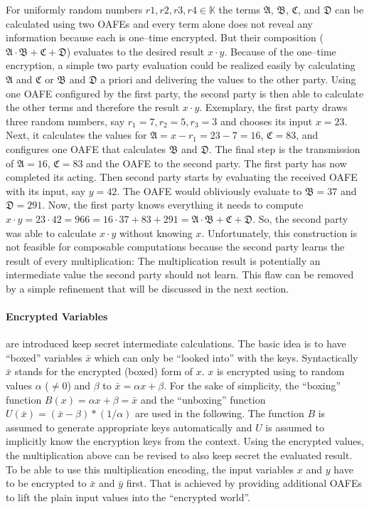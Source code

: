\noindent{}For uniformly random numbers $r1, r2, r3, r4 \in \mathbb{K}$ the
terms $\mathfrak{A}$, $\mathfrak{B}$, $\mathfrak{C}$, and $\mathfrak{D}$ can be
calculated using two OAFEs and every term alone does not reveal any information
because each is one--time encrypted. But their composition ($\mathfrak{A} \cdot
\mathfrak{B} + \mathfrak{C} + \mathfrak{D}$) evaluates to the desired result $x
\cdot y$. Because of the one--time encryption, a simple two party evaluation
could be realized easily by calculating $\mathfrak{A}$ and $\mathfrak{C}$ or
$\mathfrak{B}$ and $\mathfrak{D}$ a priori and delivering the values to the
other party. Using one OAFE configured by the first party, the second party is
then able to calculate the other terms and therefore the result $x \cdot y$.
Exemplary, the first party draws three random numbers, say $r_1=7, r_2=5, r_3=3$
and chooses its input $x=23$. Next, it calculates the values for $\mathfrak{A} =
x - r_1 = 23 - 7 = 16$, $\mathfrak{C} = 83$, and configures one OAFE that
calculates $\mathfrak{B}$ and $\mathfrak{D}$. The final step is the transmission
of $\mathfrak{A} = 16$, $\mathfrak{C} = 83$ and the OAFE to the second party.
The first party has now completed its acting. Then second party starts by
evaluating the received OAFE with its input, say $y = 42$. The OAFE would
obliviously evaluate to $\mathfrak{B} = 37$ and $\mathfrak{D} = 291$. Now, the
first party knows everything it needs to compute $x \cdot y = 23 \cdot 42 = 966
= 16 \cdot 37 + 83 + 291 = \mathfrak{A} \cdot \mathfrak{B} + \mathfrak{C} +
\mathfrak{D}$. So, the second party was able to calculate $x \cdot y$ without
knowing $x$.  Unfortunately, this construction is not feasible for composable
computations because the second party learns the result of every multiplication:
The multiplication result is potentially an intermediate value the second
party should not learn. This flaw can be removed by a simple refinement that
will be discussed in the next section.


\paragraph{Encrypted Variables} are introduced keep secret intermediate
calculations. The basic idea is to have ``boxed'' variables $\bar{x}$ which can
only be ``looked into'' with the keys. Syntactically $\bar{x}$ stands for the
encrypted (boxed) form of $x$. $x$ is encrypted using to random values $\alpha$
($\neq 0$) and $\beta$ to $\bar{x} = \alpha x + \beta$.  For the sake of
simplicity, the ``boxing'' function $B(x) = \alpha x + \beta = \bar{x}$ and the
``unboxing'' function $U(\bar{x}) = (\bar{x}-\beta)*(1/\alpha)$ are used in the
following. The function $B$ is assumed to generate appropriate keys
automatically and $U$ is assumed to implicitly know the encryption keys from the
context. Using the encrypted values, the multiplication above can be revised to
also keep secret the evaluated result. To be able to use this multiplication
encoding, the input variables $x$ and $y$ have to be encrypted to $\bar{x}$ and
$\bar{y}$ first. That is achieved by providing additional OAFEs to lift the
plain input values into the ``encrypted world''.

